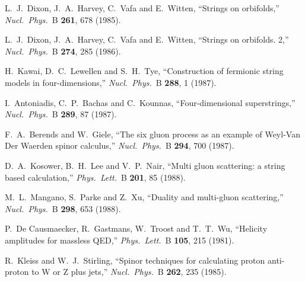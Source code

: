 \documentclass[12pt]{livrev}
\begin{document}
\begin{thebibliography}{99}
L.~J.~Dixon, J.~A.~Harvey, C.~Vafa and E.~Witten,
``Strings on orbifolds,''
{\it Nucl.\ Phys.}\ B {\bf 261}, 678 (1985).

L.~J.~Dixon, J.~A.~Harvey, C.~Vafa and E.~Witten,
``Strings on orbifolds. 2,''
{\it Nucl.\ Phys.}\ B {\bf 274}, 285 (1986).

H.~Kawai, D.~C.~Lewellen and S.~H.~Tye,
``Construction of fermionic string models in four-dimensions,''
{\it Nucl.\ Phys.}\ B {\bf 288}, 1 (1987).

I.~Antoniadis, C.~P.~Bachas and C.~Kounnas,
``Four-dimensional superstrings,''
{\it Nucl.\ Phys.}\ B {\bf 289}, 87 (1987).

F.~A.~Berends and W.~Giele,
``The six gluon process as an example of Weyl-Van Der Waerden 
spinor calculus,''
{\it Nucl.\ Phys.}\ B {\bf 294}, 700 (1987).

D.~A.~Kosower, B.~H.~Lee and V.~P.~Nair,
``Multi gluon scattering: a string based calculation,''
{\it Phys.\ Lett.}\ B {\bf 201}, 85 (1988).

M.~L.~Mangano, S.~Parke and Z.~Xu,
``Duality and multi-gluon scattering,''
{\it Nucl.\ Phys.}\ B {\bf 298}, 653 (1988).

P.~De Causmaecker, R.~Gastmans, W.~Troost and T.~T.~Wu,
``Helicity amplitudes for massless QED,''
{\it Phys.\ Lett.}\ B {\bf 105}, 215 (1981).

R.~Kleiss and W.~J.~Stirling,
``Spinor techniques for calculating proton anti-proton to W or Z plus
jets,''
{\it Nucl.\ Phys.}\ B {\bf 262}, 235 (1985).


\end{thebibliography}
\end{document}
